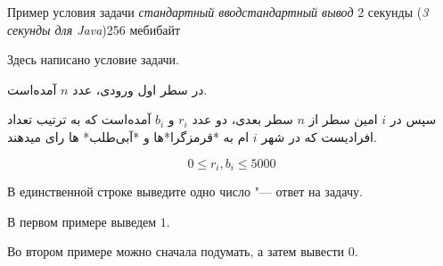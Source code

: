 \begin{problem}{Пример условия задачи}
{\textsl{стандартный ввод}}{\textsl{стандартный вывод}}
{2 секунды (\textsl{3 секунды для Java})}{256 мебибайт}{}

Здесь написано условие задачи.

\InputFile
در سطر اول ورودی، عدد $n$ آمده‌است.

سپس در $i$ امین سطر از $n$ سطر بعدی، دو عدد $r_i$ و $b_i$ آمده‌است که به ترتیب تعداد افرادیست که در شهر $i$ ام به *قرمزگرا*ها و *آبی‌طلب* ها رای میدهند.

$$0 \le r_i, b_i \le 5000$$

\OutputFile

В единственной строке выведите одно число "--- ответ на задачу.

\Examples

\begin{example}
%
%
\end{example}

\Explanations

В первом примере выведем $1$.

Во втором примере можно сначала подумать, а затем вывести $0$.

\end{problem}
